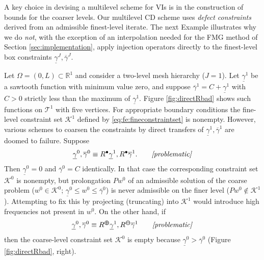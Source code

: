 \documentclass[review,hidelinks,onefignum,onetabnum,final]{siamart220329}  %
\newcommand{\RR}{\mathbb{R}}
\newcommand{\maxR}{R^{\bm{\oplus}}}
\newcommand{\minR}{R^{\bm{\ominus}}}
\newcommand{\iR}{R^{\bullet}}
\begin{document}
A key choice in devising a multilevel scheme for VIs is in the construction of bounds for the coarser levels.  Our multilevel CD scheme uses \emph{defect constraints} \cite{GraeserKornhuber2009} derived from an admissible finest-level iterate.  The next Example illustrates why we do \emph{not}, with the exception of an interpolation needed for the FMG method of Section \ref{sec:implementation}, apply injection operators directly to the finest-level box constraints $\underline{\gamma}^J,\overline{\gamma}^J$.

\begin{example}  \label{ex:directRbad}  
Let $\Omega = (0,L) \subset \RR^1$ and consider a two-level mesh hierarchy ($J=1$).  Let $\underline{\gamma}^1$ be a sawtooth function with minimum value zero, and suppose $\overline{\gamma}^1=C+\underline{\gamma}^1$ with $C>0$ strictly less than the maximum of $\underline{\gamma}^1$.  Figure \ref{fig:directRbad} shows such functions on $\mathcal{T}^1$ with five vertices.  For appropriate boundary conditions the fine-level constraint set $\mathcal{K}^1$ defined by \eqref{eq:fe:fineconstraintset} is nonempty.  However, various schemes to coarsen the constraints by direct transfers of $\underline{\gamma}^1,\overline{\gamma}^1$ are doomed to failure.  Suppose
\begin{equation}
    \label{eq:fe:badstandard}
    \underline{\gamma}^0, \overline{\gamma}^0 \equiv \iR \underline{\gamma}^1, \iR \overline{\gamma}^1. \qquad \text{\emph{[problematic]}}
\end{equation}
Then $\underline{\gamma}^0=0$ and $\overline{\gamma}^0=C$ identically.  In that case the corresponding constraint set $\mathcal{K}^0$ is nonempty, but prolongation $Pw^0$ of an admissible solution of the coarse problem ($w^0\in\mathcal{K}^0$; $\underline{\gamma}^0 \le w^0 \le \overline{\gamma}^0$) is never admissible on the finer level ($Pw^0 \notin \mathcal{K}^1$).  Attempting to fix this by projecting (truncating) into $\mathcal{K}^1$ would introduce high frequencies not present in $w^0$.  On the other hand, if
\begin{equation}
    \label{eq:fe:badmonotone}
    \underline{\gamma}^0, \overline{\gamma}^0 \equiv \maxR \underline{\gamma}^1, \minR \overline{\gamma}^1 \qquad \text{\emph{[problematic]}}
\end{equation}
then the coarse-level constraint set $\mathcal{K}^0$ is empty because $\underline{\gamma}^0 > \overline{\gamma}^0$ (Figure \ref{fig:directRbad}, right).
\end{example}
\end{document}
